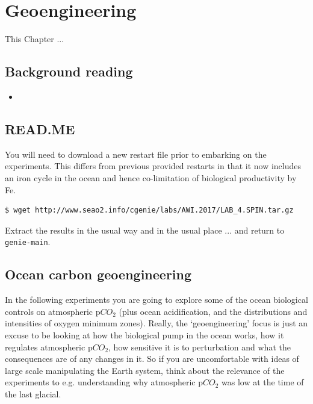 \documentclass[11pt,fleqn]{book} %
\begin{document}
\cleardoublepage


\chapter{Geoengineering}

\hfill \break

\vspace{12mm}

\noindent This Chapter ...


\section*{Background reading}
\begin{itemize}
\item 
\end{itemize}


\newpage


\section*{READ.ME}

You will need to download a new restart file prior to embarking on the experiments. This differs from previous provided restarts in that it now includes an iron cycle in the ocean and hence co-limitation of biological productivity by Fe.

\begin{verbatim}
$ wget http://www.seao2.info/cgenie/labs/AWI.2017/LAB_4.SPIN.tar.gz
\end{verbatim}

Extract the results in the usual way and in the usual place ... and return to \texttt{genie-main}.


\newpage


\section{Ocean carbon geoengineering}

In the following experiments you are going to explore some of the ocean biological controls on atmospheric p\(CO_{2}\) (plus ocean acidification, and the distributions and intensities of oxygen minimum zones). Really, the ‘geoengineering’ focus is just an excuse to be looking at how the biological pump in the ocean works, how it regulates atmospheric p\(CO_{2}\), how sensitive it is to perturbation and what the consequences are of any changes in it. So if you are uncomfortable with ideas of large scale manipulating the Earth system, think about the relevance of the experiments to e.g. understanding why atmospheric p\(CO_{2}\) was low at the time of the last glacial.
\end{document}
